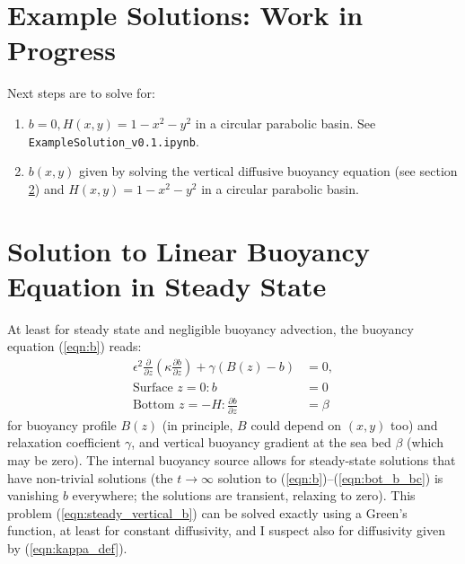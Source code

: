 \documentclass[10pt]{amsart}
\begin{document}
\section{Example Solutions: Work in Progress}


Next steps are to solve for:
\begin{enumerate}
\item $b=0, H(x,y) = 1 - x^2 - y^2$ in a circular parabolic basin. See \texttt{ExampleSolution\_v0.1.ipynb}.
\item $b(x,y)$ given by solving the vertical diffusive buoyancy equation (see section \ref{sec:b_solution}) and $H(x,y) = 1 - x^2 - y^2$ in a circular parabolic basin.
\end{enumerate}

\section{Solution to Linear Buoyancy Equation in Steady State}
\label{sec:b_solution}

At least for steady state and negligible buoyancy advection, the buoyancy equation (\ref{eqn:b}) reads:
\begin{align}
\epsilon^2 \frac{\partial }{\partial z} \left( \kappa \frac{\partial b}{\partial z} \right) + \gamma \left(  B(z) - b \right) & = 0, \label{eqn:steady_vertical_b} \\
\text{Surface~}z = 0:
b &= 0
 \\
\text{Bottom~}z = -H:
\frac{\partial b}{\partial z} &= \beta
\end{align}
for buoyancy profile $B(z)$ (in principle, $B$ could depend on $(x,y)$ too) and relaxation coefficient $\gamma$, and vertical buoyancy gradient at the sea bed $\beta$ (which may be zero). 
The internal buoyancy source allows for steady-state solutions that have non-trivial solutions (the $t\rightarrow \infty$ solution to (\ref{eqn:b})--(\ref{eqn:bot_b_bc}) is vanishing $b$ everywhere; the \citealt{peterson&callies26} solutions are transient, relaxing to zero).
This problem (\ref{eqn:steady_vertical_b}) can be solved exactly using a Green's function, at least for constant diffusivity, and I suspect also for diffusivity given by (\ref{eqn:kappa_def}). 
\end{document}

